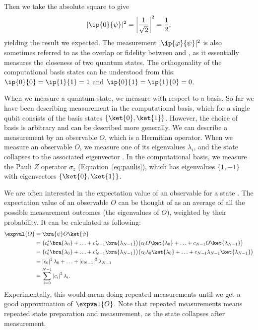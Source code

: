 \documentclass[a4paper,10pt]{article}
\begin{document}
Then we take the absolute square to give
\begin{equation}
\lvert \ip{0}{\psi} \rvert^2 = \left\lvert \dfrac{1}{\sqrt2} \right\rvert^2 = \dfrac{1}{2},
\end{equation}
yielding the result we expected.
The measurement $\lvert\ip{\varphi}{\psi}\rvert^2$ is also sometimes referred to as the overlap or fidelity between \ket{\psi} and \ket{\varphi}, as it essentially measures the closeness of two quantum states.
The orthogonality of the computational basis states can be understood from this: $\ip{0}{0} = \ip{1}{1} = 1$ and $\ip{0}{1} = \ip{1}{0} = 0$.

When we measure a quantum state, we measure with respect to a basis.
So far we have been describing measurement in the computational basis, which for a single qubit consists of the basis states $\{\ket{0}, \ket{1}\}$.
However, the choice of basis is arbitrary and can be described more generally.
We can describe a measurement by an observable $O$, which is a Hermitian operator.
When we measure an observable $O$, we measure one of its eigenvalues $\lambda_i$, and the state collapses to the associated eigenvector .
In the computational basis, we measure the Pauli $Z$ operator $\sigma_z$ (Equation~\ref{eq:paulis}), which has eigenvalues $\{1, -1\}$ with eigenvectors $\{\ket{0}, \ket{1}\}$.

We are often interested in the expectation value of an observable for a state \ket{\psi}.
The expectation value  of an observable $O$ can be thought of as an average of all the possible measurement outcomes (the eigenvalues of $O$), weighted by their probability.
It can be calculated as following:
\begin{equation}
\begin{aligned}
\expval{O} &= \bra{\psi}O\ket{\psi} \\
&= \big(c_0^*\bra{\lambda_0} + \ldots + c_{N-1}^*\bra{\lambda_{N-1}}\big) \big(c_0O\ket{\lambda_0} + \ldots + c_{N-1}O\ket{\lambda_{N-1}}\big) \\
&= \big(c_0^*\bra{\lambda_0} + \ldots + c_{N-1}^*\bra{\lambda_{N-1}}\big) \big(c_0\lambda_0\ket{\lambda_0} + \ldots + c_{N-1}\lambda_{N-1}\ket{\lambda_{N-1}}\big) \\
&=  \left\lvert c_0\right\rvert^2\lambda_0 + \ldots + \left\lvert c_{N-1}\right\rvert^2 \lambda_{N-1} \\
&= \sum_{i=0}^{N-1} \left\lvert c_i\right\rvert^2\lambda_i.
\end{aligned}
\end{equation}
Experimentally, this would mean doing repeated measurements until we get a good approximation of $\expval{O}$.
Note that repeated measurements means repeated state preparation and measurement, as the state collapses after measurement.
\end{document}
